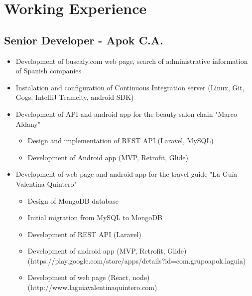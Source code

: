 \documentclass[letterpaper,11pt]{report}
\begin{document}
\section*{Working Experience}
\subsection*{Senior Developer - Apok C.A.}
  \begin{itemize}
    \item Development of buscafy.com web page, search of administrative information of Spanish companies
    \item Instalation and configuration of Continuous Integration server (Linux, Git, Gogs, IntelliJ Teamcity, android SDK)
    \item Development of API and android app for the beauty salon chain "Marco Aldany"
      \begin{itemize}
        \item Design and implementation of REST API (Laravel, MySQL)
        \item Development of Android app (MVP, Retrofit, Glide)
      \end{itemize}
    \item Development of web page and android app for the travel guide "La Guía Valentina Quintero"
      \begin{itemize}
        \item Design of MongoDB database
        \item Initial migration from MySQL to MongoDB
        \item Development of REST API (Laravel)
        \item Development of android app (MVP, Retrofit, Glide) (https://play.google.com/store/apps/details?id=com.grupoapok.laguia)
        \item Development of web page (React, node) (http://www.laguiavalentinaquintero.com)
      \end{itemize}
  \end{itemize}
\end{document}

